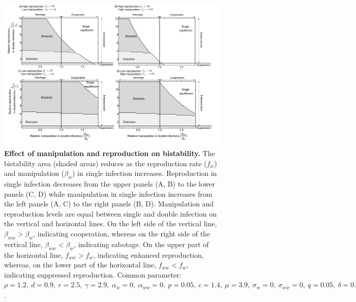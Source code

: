 \documentclass[a4paper]{scrartcl}
\begin{document}
\begin{figure}[!ht]
\captionsetup{format=plain}
\centering
\includegraphics[width=\textwidth]{Figures/manip_bifur.pdf}
\caption{\textbf{Effect of manipulation and reproduction on bistability.}
The bistability area (shaded areas) reduces as the reproduction rate ($f_w$) and manipulation ($\beta_w$) in single infection increases. 
Reproduction in single infection decreases from the upper panels (A, B) to the lower panels (C, D) while manipulation in single infection increases from the left panels (A, C) to the right panels (B, D). Manipulation and reproduction levels are equal between single and double infection on the vertical and horizontal lines. On the left side of the vertical line, $\beta_{ww} > \beta_{w}$, indicating cooperation, whereas on the right side of the vertical line, $\beta_{ww} < \beta_{w}$, indicating sabotage. On the upper part of the horizontal line, $f_{ww} > f_w$, indicating enhanced reproduction, whereas, on the lower part of the horizontal line, $f_{ww} < f_w$, indicating suppressed reproduction.
Common parameter:  $\rho = 1.2, \ d = 0.9, \ r = 2.5, \ \gamma = 2.9, \ \alpha_w = 0, \ \alpha_{ww} = 0, \ p = 0.05, \ c = 1.4, \ \mu = 3.9, \ \sigma_w = 0, \ \sigma_{ww} = 0, \ q = 0.05, \ \delta = 0.9, \ k = 0.26, \  \beta_w = 1.65, h = 0.6$.}
\label{fig:manipbifur}
\end{figure}
\end{document}
